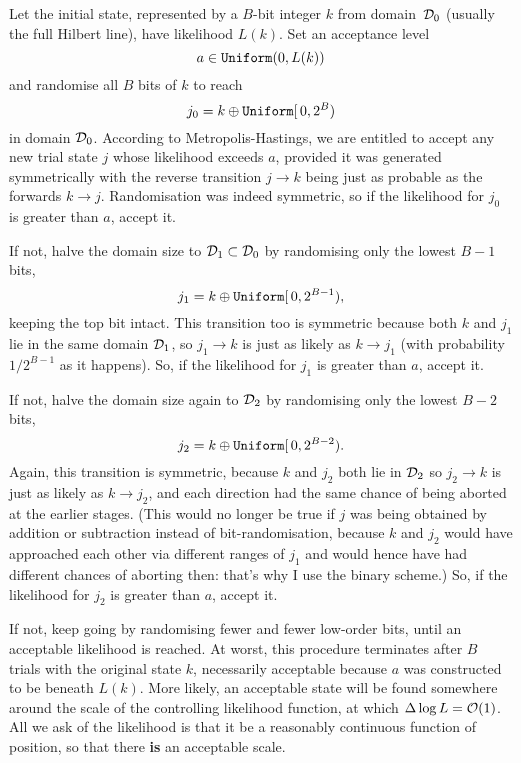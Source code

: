 Let the initial state, represented by a $B$-bit integer $k$ from domain~${\cal D}_0$ (usually the full Hilbert line), have likelihood $L(k)$.
Set an acceptance level 
$$
    a \in \hbox{\tt Uniform}(0,L(k))
$$
and randomise all $B$ bits of $k$ to reach
$$
    j_0 = k \oplus {\tt Uniform}[\,0,2^B)
$$
in domain ${\cal D}_0$.
According to Metropolis-Hastings, we are entitled to accept any new trial state $j$ whose likelihood exceeds $a$, 
provided it was generated symmetrically with the reverse transition $j \rightarrow k$ being just as probable as the forwards $k \rightarrow j$.
Randomisation was indeed symmetric, so if the likelihood for $j_0$ is greater than $a$, accept it.

If not, halve the domain size to ${\cal D}_1 \subset {\cal D}_0$ by randomising only the lowest $B-1$ bits,
$$
    j_1 = k \oplus {\tt Uniform}[\,0,2^{B-1}) ,
$$
keeping the top bit intact.
This transition too is symmetric because both $k$ and $j_1$ lie in the same domain ${\cal D}_1$, 
so $j_1 \rightarrow k$ is just as likely as $k \rightarrow j_1$ (with probability $1/2^{B-1}$ as it happens).
So, if the likelihood for $j_1$ is greater than $a$, accept it.

If not, halve the domain size again to ${\cal D}_2$ by randomising only the lowest $B-2$ bits,
$$
    j_2 = k \oplus {\tt Uniform}[\,0,2^{B-2}) .
$$
Again, this transition is symmetric, because $k$ and $j_2$ both lie in ${\cal D}_2$ so $j_2 \rightarrow k$ is just as likely as $k \rightarrow j_2$,
and each direction had the same chance of being aborted at the earlier stages.
(This would no longer be true if $j$ was being obtained by addition or subtraction instead of bit-randomisation, 
because $k$ and $j_2$ would have approached each other via different ranges of $j_1$ and would hence have had different chances of aborting then: 
that's why I use the binary scheme.)
So, if the likelihood for $j_2$ is greater than $a$, accept it.

If not, keep going by randomising fewer and fewer low-order bits, until an acceptable likelihood is reached.
At worst, this procedure terminates after $B$ trials with the original state $k$, necessarily acceptable because $a$ was constructed to be beneath $L(k)$.
More likely, an acceptable state will be found somewhere around the scale of the controlling likelihood function, at which $\Delta \log L = {\cal O}(1)$.
All we ask of the likelihood is that it be a reasonably continuous function of position, so that there {\bf is} an acceptable scale.

